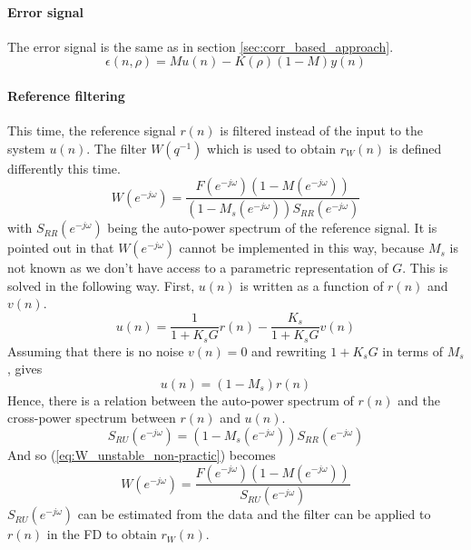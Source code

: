 \paragraph{Error signal} The error signal is the same as in section \ref{sec:corr_based_approach}.
\begin{equation*}
    \epsilon(n,\rho) = M u(n) - K(\rho) (1 - M) y(n)
\end{equation*}

\paragraph{Reference filtering}
This time, the reference signal $r(n)$ is filtered instead of the input to the system $u(n)$. The filter $W(q^{-1})$ which is used to obtain $r_W(n)$ is defined differently this time.
\begin{equation}
    W(e^{-j\omega}) = \frac{F(e^{-j\omega}) (1-M(e^{-j\omega}))}{(1-M_s(e^{-j\omega})) S_{RR}(e^{-j\omega})}
    \label{eq:W_unstable_non-practic}
\end{equation}
with $S_{RR}(e^{-j\omega})$ being the auto-power spectrum of the reference signal. It is pointed out in \cite{Data-driven_model_reference_control} that $W(e^{-j\omega})$ cannot be implemented in this way, because $M_s$ is not known as we don't have access to a parametric representation of $G$. This is solved in the following way. First, $u(n)$ is written as a function of $r(n)$ and $v(n)$.
\begin{equation*}
    u(n) = \frac{1}{1+K_s G} r(n) - \frac{K_s}{1+K_s G} v(n)
\end{equation*}
Assuming that there is no noise $v(n) = 0$ and rewriting $1+K_s G$ in terms of $M_s$, gives
\begin{equation*}
    u(n) = (1-M_s) r(n)
\end{equation*}
Hence, there is a relation between the auto-power spectrum of $r(n)$ and the cross-power spectrum between $r(n)$ and $u(n)$.
\begin{equation*}
    S_{RU}(e^{-j\omega}) = (1-M_s(e^{-j\omega})) S_{RR}(e^{-j\omega})
\end{equation*}
And so (\ref{eq:W_unstable_non-practic}) becomes
\begin{equation*}
    W(e^{-j\omega}) = \frac{F(e^{-j\omega}) (1-M(e^{-j\omega}))}{S_{RU}(e^{-j\omega})}
\end{equation*}
$S_{RU}(e^{-j\omega})$ can be estimated from the data and the filter can be applied to $r(n)$ in the FD to obtain $r_W(n)$.

